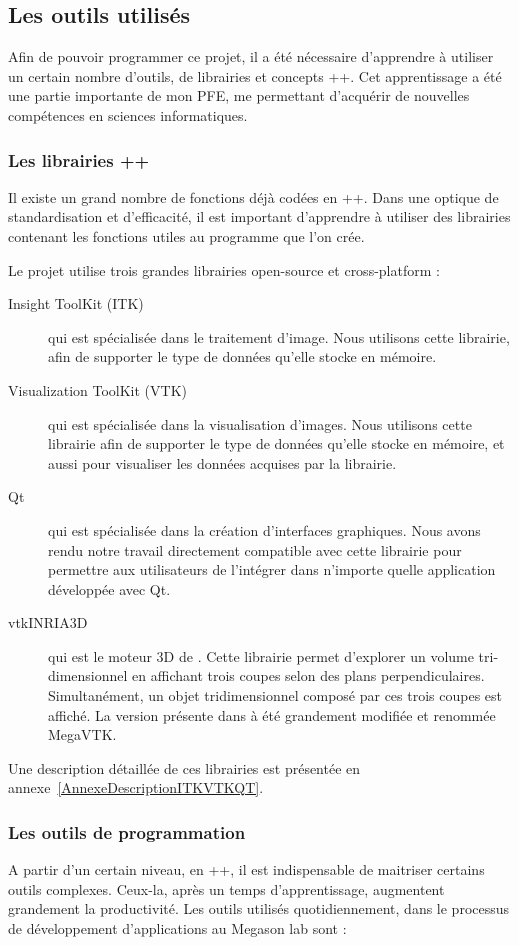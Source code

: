 \subsection{Les outils utilisés}
Afin de pouvoir programmer ce projet,
il a été nécessaire d'apprendre à utiliser un certain nombre d'outils,
de librairies et concepts {\C++}. Cet apprentissage a été une
partie importante de mon PFE, me permettant d'acquérir de
nouvelles compétences en sciences informatiques.
\subsubsection{Les librairies \C++}
Il existe un grand nombre de fonctions déjà codées en {\C++}.
Dans une optique de standardisation et d'efficacité, il est important d'apprendre
à utiliser des librairies contenant les fonctions utiles au programme que l'on crée.

Le projet utilise trois grandes librairies open-source et cross-platform :
\begin{description}
  \item[Insight ToolKit (ITK)] qui est spécialisée dans le traitement d'image. Nous utilisons cette librairie, 
  afin de supporter le type de données qu'elle stocke en mémoire.
  \item[Visualization ToolKit (VTK)] qui est spécialisée dans la visualisation d'images. 
  Nous utilisons cette librairie afin de supporter le type de données qu'elle stocke en mémoire,
  et aussi pour visualiser les données acquises par la librairie.
  \item[Qt]\cite{refQT} qui est spécialisée dans la création d'interfaces graphiques. 
  Nous avons rendu notre travail directement compatible avec cette librairie
  pour permettre aux utilisateurs de l'intégrer dans n'importe quelle application développée avec Qt.
  \item[vtkINRIA3D]{\cite{vtkINRIA}} qui est le moteur 3D de {\gofigure}\cite{refGofigure2}.
  Cette librairie permet d'explorer un volume tri-dimensionnel en affichant trois coupes selon des plans perpendiculaires.
  Simultanément, un objet tridimensionnel composé par ces trois coupes est affiché.
  La version présente dans {\gofigure} à été grandement modifiée et renommée MegaVTK.
\end{description}
Une description détaillée de ces librairies est présentée en annexe~\ref{AnnexeDescriptionITKVTKQT}.


\subsubsection{Les outils de programmation}
A partir d'un certain niveau, en {\C++}, il est indispensable de maitriser certains outils complexes. Ceux-la, après un temps
 d'apprentissage, augmentent grandement la productivité.
Les outils utilisés quotidiennement, dans le processus de développement d'applications au Megason lab sont :

